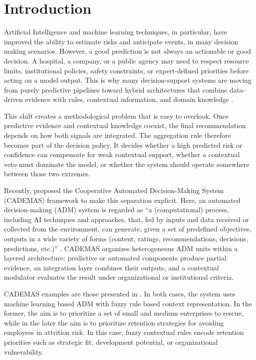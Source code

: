 \documentclass[mathematics,article,submit,moreauthors]{Definitions/mdpi}
\begin{document}
\section{Introduction}

Artificial Intelligence and machine learning techniques, in particular, have improved the ability to estimate risks and anticipate events, in many decision making scenarios. 
However, a good prediction is not always an actionable or good decision. A hospital, a company, or a public agency may need to respect resource limits, institutional policies, safety constraints, or expert-defined priorities before acting on a model output. This is why many decision-support systems are moving from purely predictive pipelines toward hybrid architectures that combine data-driven evidence with rules, contextual information, and domain knowledge \citep{Kierner2023,Rahman2025,PerezDominguez2024}.

This shift creates a methodological problem that is easy to overlook. Once predictive evidence and contextual knowledge coexist, the final recommendation depends on how both signals are integrated. The aggregation rule therefore becomes part of the decision policy. It decides whether a high predicted risk or confidence can compensate for weak contextual support, whether a contextual veto must dominate the model, or whether the system should operate somewhere between those two extremes.


{\color{blue} Recently, \citet{NovoaHernandez2026} proposed the Cooperative Automated Decision-Making System (CADEMAS) framework to make this separation explicit. Here, an automated decision-making (ADM) system is regarded as ``a (computational) process, including AI techniques and approaches, that, fed by inputs and data received or collected from the environment, can generate, given a set of predefined objectives, outputs in a wide variety of forms (content, ratings, recommendations, decisions, predictions, etc.)'' \cite{ELI_ADM_Principles_2022}. CADEMAS organizes heterogeneous ADM units within a layered architecture: predictive or automated components produce partial evidence, an integration layer combines their outputs, and a contextual modulator evaluates the result under organizational or institutional criteria.}

CADEMAS examples are those presented in \citep{NovoaHernandez2026, Godz2026}. In both cases, the system uses machine learning based ADM with fuzzy rule based context representation. In the former, the aim is to prioritize a set of small and medium enterprises to rescue, while in the later the aim is to prioritize retention strategies for avoiding employees in attrition risk. In this case, 
fuzzy contextual rules encode retention priorities such as strategic fit, development potential, or organizational vulnerability.
\end{document}
